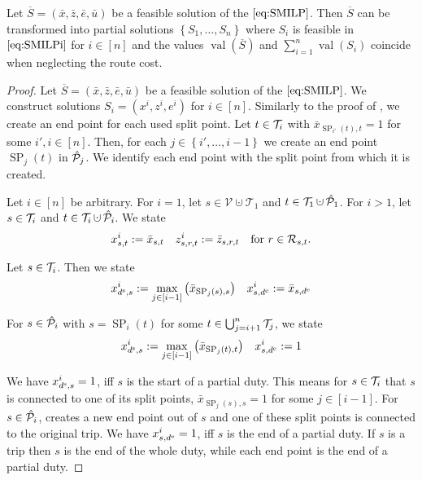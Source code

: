 \begin{theorem}
\label{thm:equivalence_SMILP_heuristic}

Let ${\overline{S}=\left(\bar{x},\bar{z},\bar{e},\bar{u}\right)}$ be a feasible solution of the $\eqref{eq:SMILP}$. Then $\overline{S}$ can be transformed into partial solutions $\left\{S_1,\dots,S_n\right\}$ where $S_i$ is feasible in $\eqref{eq:SMILPi}$ for ${i\in[n]}$ and the values $\operatorname{val}(\overline{S})$ and ${\sum_{i=1}^n \operatorname{val}\left(S_i\right)}$ coincide when neglecting the route cost.

\end{theorem}

\begin{proof}

Let ${\overline{S}=\left(\bar{x},\bar{z},\bar{e},\bar{u}\right)}$ be a feasible solution of the $\eqref{eq:SMILP}$. We construct solutions ${S_i=\left(x^i,z^i,e^i\right)}$ for ${i\in[n]}$. Similarly to the proof of , we create an end point for each used split point. Let ${t\in\mathcal{T}_i}$ with ${\bar{x}_{\operatorname{SP}_{i'}(t),t}=1}$ for some ${i',i\in[n]}$. Then, for each ${j\in\left\{i',\dots,i-1\right\}}$ we create an end point $\operatorname{SP}_j(t)$ in $\hat{\mathcal{P}}_j$. We identify each end point with the split point from which it is created.

Let ${i\in[n]}$ be arbitrary. For ${i=1}$, let ${s\in\mathcal{V}\cupdot\mathcal{T}_1}$ and ${t\in\mathcal{T}_1\cupdot\Phat_1}$. For ${i>1}$, let ${s\in\mathcal{T}_i}$ and ${t\in\Ti\cupdot\Phat_i}$. We state
\begin{align*}
	x^i_{s,t} := \bar{x}_{s,t} && z^i_{s,r,t} := \bar{z}_{s,r,t} && \text{for } r\in\mathcal{R}_{s,t}.
\end{align*}

Let ${s\in\mathcal{T}_i}$. Then we state
\begin{align*}
	x^i_{d^{\operatorname{s}},s} := \max_{j\in[i-1]} \left(\bar{x}_{\operatorname{SP}_j(s),s}\right) && x^i_{s,d^{\operatorname{e}}} := \bar{x}_{s,d^{\operatorname{e}}}
\end{align*}

For ${s\in\hat{\mathcal{P}}_i}$ with ${s=\operatorname{SP}_i(t)}$ for some ${t\in\bigcup_{j=i+1}^n\mathcal{T}_j}$, we state
\begin{align*}
	x^i_{d^{\operatorname{s}},s} := \max_{j\in[i-1]} \left(\bar{x}_{\operatorname{SP}_j(t),t}\right) && x^i_{s,d^{\operatorname{e}}} := 1
\end{align*}

We have ${x^i_{d^{\operatorname{s}},s}=1}$, iff $s$ is the start of a partial duty. This means for ${s\in\mathcal{T}_i}$ that $s$ is connected to one of its split points, \ie ${\bar{x}_{\operatorname{SP}_j(s),s}=1}$ for some ${j\in[i-1]}$. For ${s\in\hat{\mathcal{P}}_i}$,  creates a new end point out of $s$ and one of these split points is connected to the original trip. We have ${x^i_{s,d^{\operatorname{e}}}=1}$, iff $s$ is the end of a partial duty. If $s$ is a trip then $s$ is the end of the whole duty, while each end point is the end of a partial duty.


\end{proof}
